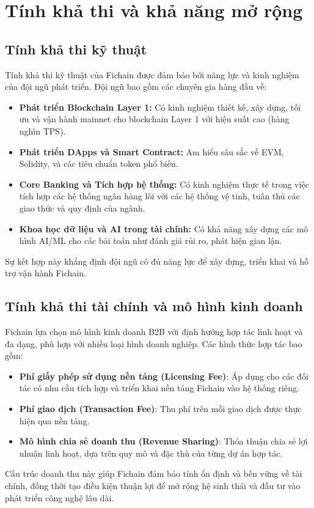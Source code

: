 \section{Tính khả thi và khả năng mở rộng}

\subsection{Tính khả thi kỹ thuật}
Tính khả thi kỹ thuật của Fichain được đảm bảo bởi năng lực và kinh nghiệm của đội ngũ phát triển. Đội ngũ bao gồm các chuyên gia hàng đầu về:
\begin{itemize}
    \item \textbf{Phát triển Blockchain Layer 1:} Có kinh nghiệm thiết kế, xây dựng, tối ưu và vận hành mainnet cho blockchain Layer 1 với hiệu suất cao (hàng nghìn TPS).
    \item \textbf{Phát triển DApps và Smart Contract:} Am hiểu sâu sắc về EVM, Solidity, và các tiêu chuẩn token phổ biến.
    \item \textbf{Core Banking và Tích hợp hệ thống:} Có kinh nghiệm thực tế trong việc tích hợp các hệ thống ngân hàng lõi với các hệ thống vệ tinh, tuân thủ các giao thức và quy định của ngành.
    \item \textbf{Khoa học dữ liệu và AI trong tài chính:} Có khả năng xây dựng các mô hình AI/ML cho các bài toán như đánh giá rủi ro, phát hiện gian lận.
\end{itemize}
Sự kết hợp này khẳng định đội ngũ có đủ năng lực để xây dựng, triển khai và hỗ trợ vận hành Fichain.

\subsection{Tính khả thi tài chính và mô hình kinh doanh}
Fichain lựa chọn mô hình kinh doanh B2B với định hướng hợp tác linh hoạt và đa dạng, phù hợp với nhiều loại hình doanh nghiệp. Các hình thức hợp tác bao gồm:
\begin{itemize}
    \item \textbf{Phí giấy phép sử dụng nền tảng (Licensing Fee)}: Áp dụng cho các đối tác có nhu cầu tích hợp và triển khai nền tảng Fichain vào hệ thống riêng.
    \item \textbf{Phí giao dịch (Transaction Fee)}: Thu phí trên mỗi giao dịch được thực hiện qua nền tảng.
    \item \textbf{Mô hình chia sẻ doanh thu (Revenue Sharing)}: Thỏa thuận chia sẻ lợi nhuận linh hoạt, dựa trên quy mô và đặc thù của từng dự án hợp tác.
\end{itemize}
Cấu trúc doanh thu này giúp Fichain đảm bảo tính ổn định và bền vững về tài chính, đồng thời tạo điều kiện thuận lợi để mở rộng hệ sinh thái và đầu tư vào phát triển công nghệ lâu dài.

